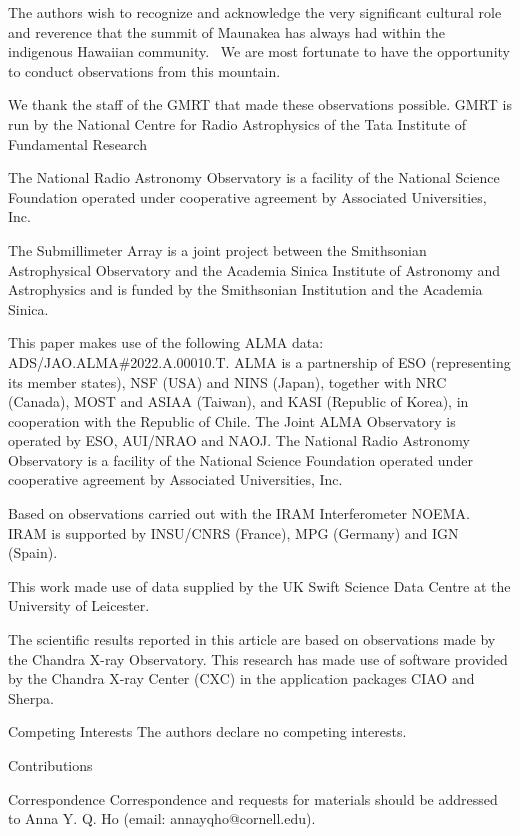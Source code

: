 \documentclass{nature_plusfigure}
\begin{document}
\begin{addendum}
The authors wish to recognize and acknowledge the very significant cultural role and reverence that the summit of Maunakea has always had within the indigenous Hawaiian community.  We are most fortunate to have the opportunity to conduct observations from this mountain.

We thank the staff of the GMRT that made these observations possible. GMRT is run by the National Centre for Radio Astrophysics of the Tata Institute of Fundamental Research

The National Radio Astronomy Observatory is a facility of the National Science Foundation operated under cooperative agreement by Associated Universities, Inc.

The Submillimeter Array is a joint project between the Smithsonian Astrophysical Observatory and the Academia Sinica Institute of Astronomy and Astrophysics and is funded by the Smithsonian Institution and the Academia Sinica.

This paper makes use of the following ALMA data: ADS/JAO.ALMA\#2022.A.00010.T. ALMA is a partnership of ESO (representing its member states), NSF (USA) and NINS (Japan), together with NRC (Canada), MOST and ASIAA (Taiwan), and KASI (Republic of Korea), in cooperation with the Republic of Chile. The Joint ALMA Observatory is operated by ESO, AUI/NRAO and NAOJ. The National Radio Astronomy Observatory is a facility of the National Science Foundation operated under cooperative agreement by Associated Universities, Inc.

Based on observations carried out with the IRAM Interferometer NOEMA. IRAM is supported by INSU/CNRS (France), MPG (Germany) and IGN (Spain).

This work made use of data supplied by the UK Swift Science Data Centre at the University of Leicester.

The scientific results reported in this article are based on observations made by the Chandra X-ray Observatory. This research has made use of software provided by the Chandra X-ray Center (CXC) in the application packages CIAO and Sherpa.

 \item[Competing Interests] The authors declare no competing interests.

\item[Contributions] 

 \item[Correspondence] Correspondence and requests for materials
should be addressed to Anna Y. Q. Ho (email: annayqho@cornell.edu).


\end{addendum}
\end{document}
